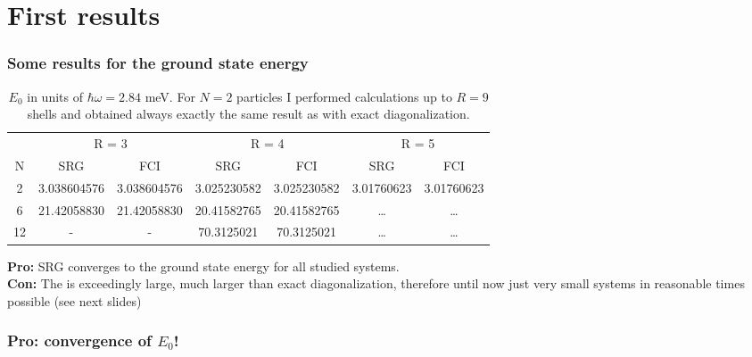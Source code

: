 \documentclass[9pt]{beamer}
\begin{document}
\section{First results}
\begin{frame}
\frametitle{Some results for the ground state energy}
\begin{table}
\begin{center}
\small
\tabcolsep=0.09cm
\begin{tabular}{|c| c c| c c| c c |}
\hline\hline
 & \multicolumn{2}{|c|}{R = 3} & \multicolumn{2}{|c|}{R = 4} & \multicolumn{2}{|c|}{R = 5}\\
 N & SRG&FCI & SRG &FCI & SRG &  FCI\\
 \hline
 2 & 3.038604576&3.038604576&  3.025230582& 3.025230582& 3.01760623 &3.01760623 \\
 6 & 21.42058830& 21.42058830 &  20.41582765&  20.41582765 & \dots & \dots\\
 12 & -&- &  70.3125021{\color{red}{9}} &70.3125021{\color{red}{8}} & \dots & \dots \\
 \hline\hline
\end{tabular}
\end{center}
\caption{$E_0$ in units of $\hbar\omega = 2.84$ meV. For $N = 2$ particles I performed calculations up to $R = 9$ shells and obtained always exactly the same result as with exact diagonalization.}
\end{table}

\textbf{Pro:} SRG converges to the {\color{red}{exact}} ground state energy for all studied systems.\\
\textbf{Con:} The {\color{red}{required timed}} is exceedingly large, much larger than exact diagonalization, therefore until now just very small systems in reasonable times possible (see next slides)
\end{frame}

\begin{frame}
\frametitle{Pro: convergence of $E_0$! }
\begin{figure}
\end{figure}
\end{frame}
\end{document}
